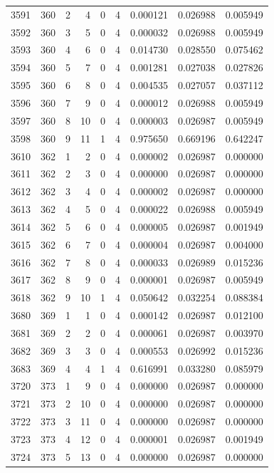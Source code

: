 \begin{longtable}{rrrrrrrrr}
3591 & 360 & 2 & 4 & 0 & 4 & 0.000121 & 0.026988 & 0.005949 \\
3592 & 360 & 3 & 5 & 0 & 4 & 0.000032 & 0.026988 & 0.005949 \\
3593 & 360 & 4 & 6 & 0 & 4 & 0.014730 & 0.028550 & 0.075462 \\
3594 & 360 & 5 & 7 & 0 & 4 & 0.001281 & 0.027038 & 0.027826 \\
3595 & 360 & 6 & 8 & 0 & 4 & 0.004535 & 0.027057 & 0.037112 \\
3596 & 360 & 7 & 9 & 0 & 4 & 0.000012 & 0.026988 & 0.005949 \\
3597 & 360 & 8 & 10 & 0 & 4 & 0.000003 & 0.026987 & 0.005949 \\
3598 & 360 & 9 & 11 & 1 & 4 & 0.975650 & 0.669196 & 0.642247 \\
3610 & 362 & 1 & 2 & 0 & 4 & 0.000002 & 0.026987 & 0.000000 \\
3611 & 362 & 2 & 3 & 0 & 4 & 0.000000 & 0.026987 & 0.000000 \\
3612 & 362 & 3 & 4 & 0 & 4 & 0.000002 & 0.026987 & 0.000000 \\
3613 & 362 & 4 & 5 & 0 & 4 & 0.000022 & 0.026988 & 0.005949 \\
3614 & 362 & 5 & 6 & 0 & 4 & 0.000005 & 0.026987 & 0.001949 \\
3615 & 362 & 6 & 7 & 0 & 4 & 0.000004 & 0.026987 & 0.004000 \\
3616 & 362 & 7 & 8 & 0 & 4 & 0.000033 & 0.026989 & 0.015236 \\
3617 & 362 & 8 & 9 & 0 & 4 & 0.000001 & 0.026987 & 0.005949 \\
3618 & 362 & 9 & 10 & 1 & 4 & 0.050642 & 0.032254 & 0.088384 \\
3680 & 369 & 1 & 1 & 0 & 4 & 0.000142 & 0.026987 & 0.012100 \\
3681 & 369 & 2 & 2 & 0 & 4 & 0.000061 & 0.026987 & 0.003970 \\
3682 & 369 & 3 & 3 & 0 & 4 & 0.000553 & 0.026992 & 0.015236 \\
3683 & 369 & 4 & 4 & 1 & 4 & 0.616991 & 0.033280 & 0.085979 \\
3720 & 373 & 1 & 9 & 0 & 4 & 0.000000 & 0.026987 & 0.000000 \\
3721 & 373 & 2 & 10 & 0 & 4 & 0.000000 & 0.026987 & 0.000000 \\
3722 & 373 & 3 & 11 & 0 & 4 & 0.000000 & 0.026987 & 0.000000 \\
3723 & 373 & 4 & 12 & 0 & 4 & 0.000001 & 0.026987 & 0.001949 \\
3724 & 373 & 5 & 13 & 0 & 4 & 0.000000 & 0.026987 & 0.000000 \\

\end{longtable}
